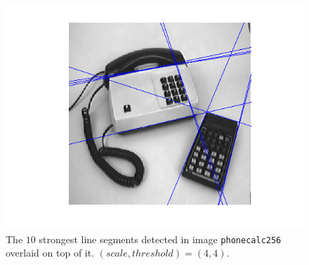     \begin{figure}[H]
      \centering
      \includegraphics[scale=0.8]{./images/Q8/phonecalc256/1.png}
      \caption{The $10$ strongest line segments detected in image
        \texttt{phonecalc256} overlaid on top of it. $(scale, threshold) = (4,4)$.}
      \label{fig:Q8_phonecalc256_1}
    \end{figure}

